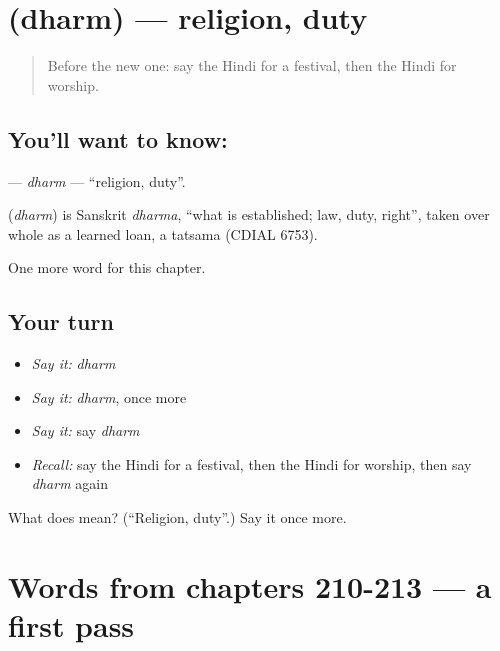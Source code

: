 \section[\texorpdfstring{\hi{धर्म} (dharm)}{धर्म (dharm)}]{ (dharm) — religion, duty}

\label{lesson:HI-C217-dharm}



\begin{quote}
Before the new one: say the Hindi for a festival, then the Hindi for worship.
\end{quote}

\subsection*{You'll want to know: }
\textbf{} — \emph{dharm} — \textquotedblleft{}religion, duty\textquotedblright{}.

\begin{cousinweb}
\textbf{} (\emph{dharm}) is Sanskrit \emph{dharma}, \textquotedblleft{}what is established; law, duty, right\textquotedblright{}, taken over whole as a learned loan, a tatsama (CDIAL 6753).
\end{cousinweb}

\begin{grammarlens}[title={What you've built}]
One more word for this chapter.
\end{grammarlens}

\subsection*{Your turn}
\begin{itemize}
\raggedright
  \item \emph{Say it:} \emph{dharm}
  \item \emph{Say it:} \emph{dharm}, once more
  \item \emph{Say it:} say \emph{dharm}
  \item \emph{Recall:} say the Hindi for a festival, then the Hindi for worship, then say \emph{dharm} again
\end{itemize}

\begin{tcolorbox}[breakable,colback=teal!4,colframe=teal!35!black,title={Before you move on}]
What does  mean? (\textquotedblleft{}Religion, duty\textquotedblright{}.) Say it once more.
\end{tcolorbox}
\section[(dialogue)]{Words from chapters 210-213 — a first pass}

